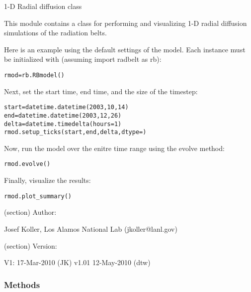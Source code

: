 1-D Radial diffusion class

This module contains a class for performing and visualizing 1-D radial 
diffusion simulations of the radiation belts.

Here is an example using the default settings of the model. Each instance 
must be initialized with (assuming import radbelt as rb):

\begin{alltt}
\pysrcprompt{{\textgreater}{\textgreater}{\textgreater} }rmod = rb.RBmodel()\end{alltt}
Next, set the start time, end time, and the size of the timestep:

\begin{alltt}
\pysrcprompt{{\textgreater}{\textgreater}{\textgreater} }start = datetime.datetime(2003,10,14)
\pysrcprompt{{\textgreater}{\textgreater}{\textgreater} }end = datetime.datetime(2003,12,26)
\pysrcprompt{{\textgreater}{\textgreater}{\textgreater} }delta = datetime.timedelta(hours=1)
\pysrcprompt{{\textgreater}{\textgreater}{\textgreater} }rmod.setup\_ticks(start, end, delta, dtype=)\end{alltt}
Now, run the model over the enitre time range using the evolve method:

\begin{alltt}
\pysrcprompt{{\textgreater}{\textgreater}{\textgreater} }rmod.evolve()\end{alltt}
Finally, visualize the results:

\begin{alltt}
\pysrcprompt{{\textgreater}{\textgreater}{\textgreater} }rmod.plot\_summary()\end{alltt}
(section) Author:

  Josef Koller, Los Alamos National Lab (jkoller@lanl.gov)

(section) Version:

  V1: 17-Mar-2010 (JK) v1.01 12-May-2010 (dtw)



  \subsubsection{Methods}

    \vspace{0.5ex}

